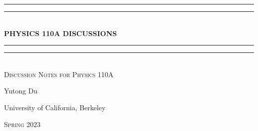 \documentclass{book}
\begin{document}
    \begin{titlepage}
        \centering
        \vspace*{\baselineskip}\vspace{200pt}
        \rule{\textwidth}{1.6pt}\vspace*{-\baselineskip}\vspace*{2pt}
        \rule{\textwidth}{0.4pt}\\[\baselineskip]
        {\Huge \bfseries \MakeUppercase{Physics 110A} DISCUSSIONS}\\[0.2\baselineskip]
        \rule{\textwidth}{0.4pt}\vspace*{-\baselineskip}\vspace{3.2pt}
        \rule{\textwidth}{1.6pt}\\[\baselineskip]
        \scshape
		Discussion Notes for Physics 110A
        \par
        \vspace*{2pt}
        {\Large Yutong Du}\\
        {\large University of California, Berkeley\par}
        {\scshape Spring 2023} \\
    \end{titlepage}
        
	
\end{document}

